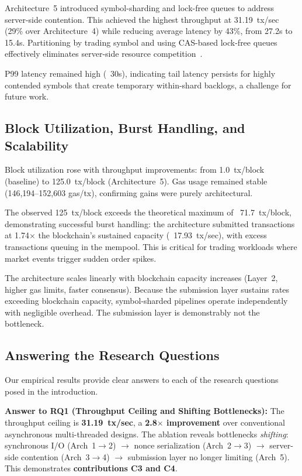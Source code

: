 Architecture~5 introduced symbol-sharding and lock-free queues to address server-side contention. This achieved the highest throughput at 31.19~tx/sec (29\% over Architecture~4) while reducing average latency by 43\%, from 27.2s to 15.4s. Partitioning by trading symbol and using CAS-based lock-free queues effectively eliminates server-side resource competition~\cite{harris2001pragmatic}.

P99 latency remained high (~30s), indicating tail latency persists for highly contended symbols that create temporary within-shard backlogs, a challenge for future work.

\subsection{Block Utilization, Burst Handling, and Scalability}

Block utilization rose with throughput improvements: from 1.0~tx/block (baseline) to 125.0~tx/block (Architecture~5). Gas usage remained stable (146,194--152,603 gas/tx), confirming gains were purely architectural.

The observed 125~tx/block exceeds the theoretical maximum of ~71.7~tx/block, demonstrating successful burst handling: the architecture submitted transactions at 1.74$\times$ the blockchain's sustained capacity (~17.93~tx/sec), with excess transactions queuing in the mempool. This is critical for trading workloads where market events trigger sudden order spikes.

The architecture scales linearly with blockchain capacity increases (Layer~2, higher gas limits, faster consensus). Because the submission layer sustains rates exceeding blockchain capacity, symbol-sharded pipelines operate independently with negligible overhead. The submission layer is demonstrably not the bottleneck.

\subsection{Answering the Research Questions}

Our empirical results provide clear answers to each of the research questions posed in the introduction.

\textbf{Answer to RQ1 (Throughput Ceiling and Shifting Bottlenecks):} The throughput ceiling is \textbf{31.19~tx/sec}, a \textbf{2.8$\times$ improvement} over conventional asynchronous multi-threaded designs. The ablation reveals bottlenecks \textit{shifting}: synchronous I/O (Arch~1$\rightarrow$2) $\rightarrow$ nonce serialization (Arch~2$\rightarrow$3) $\rightarrow$ server-side contention (Arch~3$\rightarrow$4) $\rightarrow$ submission layer no longer limiting (Arch~5). This demonstrates \textbf{contributions C3 and C4}.

